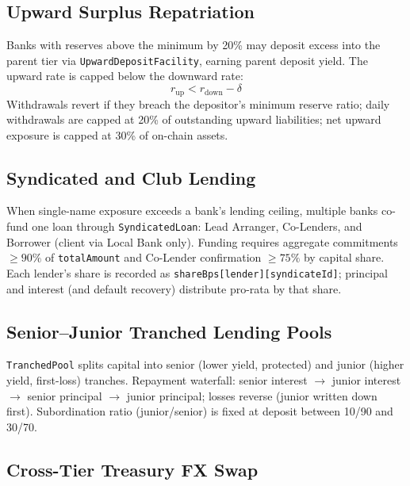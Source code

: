 \documentclass[12pt,a4paper]{report}
\begin{document}
\subsection{Upward Surplus Repatriation}
\label{sec:upward-flow}

Banks with reserves above the minimum by 20\% may deposit excess into the parent tier via \texttt{UpwardDepositFacility}, earning parent deposit yield. The upward rate is capped below the downward rate:
\begin{equation}
r_{\text{up}} < r_{\text{down}} - \delta
\end{equation}
\noindent Withdrawals revert if they breach the depositor's minimum reserve ratio; daily withdrawals are capped at 20\% of outstanding upward liabilities; net upward exposure is capped at 30\% of on-chain assets.

\subsection{Syndicated and Club Lending}
\label{sec:syndicated-lending}

When single-name exposure exceeds a bank's lending ceiling, multiple banks co-fund one loan through \texttt{SyndicatedLoan}: Lead Arranger, Co-Lenders, and Borrower (client via Local Bank only). Funding requires aggregate commitments $\ge 90\%$ of \texttt{totalAmount} and Co-Lender confirmation $\ge 75\%$ by capital share. Each lender's share is recorded as \texttt{shareBps[lender][syndicateId]}; principal and interest (and default recovery) distribute pro-rata by that share.

\subsection{Senior--Junior Tranched Lending Pools}
\label{sec:tranched-pools}

\texttt{TranchedPool} splits capital into senior (lower yield, protected) and junior (higher yield, first-loss) tranches. Repayment waterfall: senior interest $\to$ junior interest $\to$ senior principal $\to$ junior principal; losses reverse (junior written down first). Subordination ratio (junior/senior) is fixed at deposit between 10/90 and 30/70.

\subsection{Cross-Tier Treasury FX Swap}
\label{sec:treasury-fx}
\end{document}
